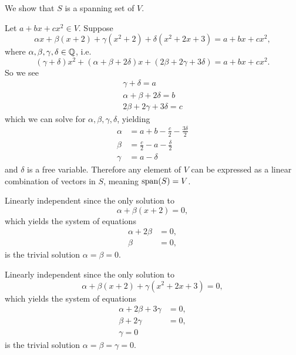 \begin{questions}
    \item We show that $S$ is a spanning set of $V$.

    Let $a + bx + cx^2 \in V$. Suppose
    \[
        \alpha x + \beta(x + 2) + \gamma(x^2 + 2) + \delta(x^2 + 2x + 3) = a + bx + cx^2,
    \]
    where $\alpha, \beta, \gamma, \delta \in \mathbb{Q}$, i.e.
    \[
        (\gamma + \delta)x^2 + (\alpha + \beta + 2\delta)x + (2\beta + 2\gamma + 3\delta) = a + bx + cx^2.
    \]
    So we see
    \begin{align*}
        \gamma + \delta = a\\
        \alpha + \beta + 2\delta = b\\
        2\beta + 2\gamma + 3\delta = c
    \end{align*}
    which we can solve for $\alpha, \beta, \gamma, \delta$, yielding
    \begin{align*}
        \alpha &= a + b - \frac{c}{2} - \frac{3\delta}{2}\\
        \beta &= \frac{c}{2} - a - \frac{\delta}{2}\\
        \gamma &= a - \delta
    \end{align*}
    and $\delta$ is a free variable. Therefore any element of $V$ can be expressed as a linear combination of vectors in $S$, meaning $\mathrm{span}(S) = V$.

    \item \begin{partquestions}{\alph*}
        \item Linearly independent since the only solution to
        \[
            \alpha + \beta(x+2) = 0,
        \]
        which yields the system of equations
        \begin{align*}
            \alpha + 2\beta &= 0,\\
            \beta &= 0,
        \end{align*}
        is the trivial solution $\alpha = \beta = 0$.

        \item Linearly independent since the only solution to
        \[
            \alpha + \beta(x+2) + \gamma(x^2 + 2x + 3) = 0,
        \]
        which yields the system of equations
        \begin{align*}
            \alpha + 2\beta + 3\gamma &= 0,\\
            \beta + 2\gamma &= 0,\\
            \gamma = 0
        \end{align*}
        is the trivial solution $\alpha = \beta = \gamma = 0$.


\end{partquestions}
\end{questions}
